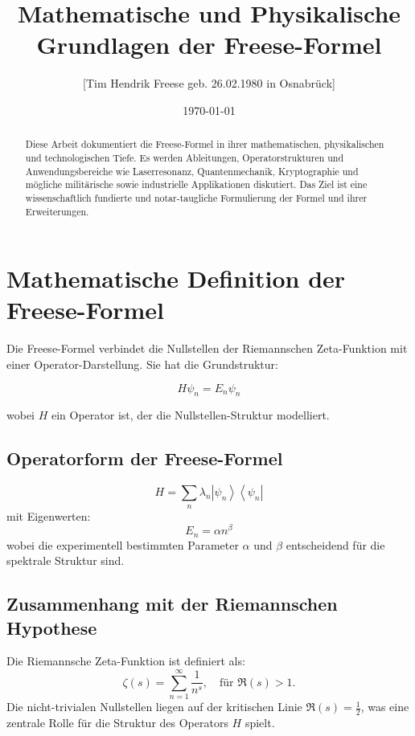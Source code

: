 \documentclass[a4paper,12pt]{article}
\title{Mathematische und Physikalische Grundlagen der Freese-Formel}
\author{[Tim Hendrik Freese geb. 26.02.1980 in Osnabrück]}
\date{\today}
\begin{document}
\maketitle
\begin{abstract}
Diese Arbeit dokumentiert die Freese-Formel in ihrer mathematischen, physikalischen und technologischen Tiefe.
Es werden Ableitungen, Operatorstrukturen und Anwendungsbereiche wie Laserresonanz, Quantenmechanik, Kryptographie und
mögliche militärische sowie industrielle Applikationen diskutiert. Das Ziel ist eine wissenschaftlich fundierte und notar-taugliche Formulierung der Formel und ihrer Erweiterungen.
\end{abstract}

\section{Mathematische Definition der Freese-Formel}
Die Freese-Formel verbindet die Nullstellen der Riemannschen Zeta-Funktion mit einer Operator-Darstellung. Sie hat die Grundstruktur:

\begin{equation}
H \psi_n = E_n \psi_n
\end{equation}

wobei $H$ ein Operator ist, der die Nullstellen-Struktur modelliert.

\subsection{Operatorform der Freese-Formel}
\begin{equation}
H = \sum_{n} \lambda_n \left| \psi_n \right\rangle \left\langle \psi_n \right|
\end{equation}
mit Eigenwerten:
\begin{equation}
E_n = \alpha n^\beta
\end{equation}
wobei die experimentell bestimmten Parameter $\alpha$ und $\beta$ entscheidend für die spektrale Struktur sind.

\subsection{Zusammenhang mit der Riemannschen Hypothese}
Die Riemannsche Zeta-Funktion ist definiert als:
\begin{equation}
\zeta(s) = \sum_{n=1}^{\infty} \frac{1}{n^s}, \quad \text{für } \Re(s) > 1.
\end{equation}
Die nicht-trivialen Nullstellen liegen auf der kritischen Linie $\Re(s) = \frac{1}{2}$, was eine zentrale Rolle für die Struktur des Operators $H$ spielt.
\end{document}
